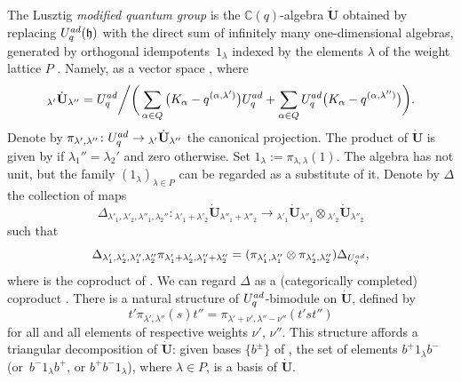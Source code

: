 \documentclass[11pt]{article}
\numberwithin{equation}{section}
\numberwithin{equation}{section}
\theoremstyle{definition}
\newcommand{\mc}{\mathbb{C}}
\newcommand{\ra}{\rightarrow}
\begin{document}
The Lusztig {\it modified quantum group} is the $\mc(q)$-algebra $\dot{\mathbf{U}}$ obtained by replacing $U_q^{\rm ad}(\mathfrak{h})$ with the direct sum of infinitely many one-dimensional algebras, generated by orthogonal idempotents~$1_\lambda$ indexed by the elements $\lambda$ of the weight lattice $P$ \cite[Chapter~23]{Lusztig}. Namely, as a vector space , where
\[{}_{\lambda'}\dot{\mathbf{U}}{}_{\lambda''} = U_q^{\rm ad}\bigg/\bigg(\sum_{\alpha\in Q} \big(K_\alpha -q^{(\alpha,\lambda')}\big)U_q^{\rm ad}+ \sum_{\alpha\in Q} U_q^{\rm ad}\big(K_\alpha -q^{(\alpha,\lambda'')}\big)\bigg).\]
Denote by $\pi_{\lambda',\lambda''}\colon U_q^{\rm ad} \ra {}_{\lambda'}\dot{\mathbf{U}}{}_{\lambda''}$ the canonical projection. The product of $\dot{\mathbf{U}}$ is given by  if $\lambda_1''=\lambda_2'$ and zero otherwise. Set $1_\lambda := \pi_{\lambda,\lambda}(1)$. The algebra  has not unit, but the family $(1_\lambda)_{\lambda\in P}$ can be regarded as a substitute of it. Denote by $\Delta$ the collection of maps
\[
\Delta_{\lambda'_1,\lambda'_2,\lambda''_1,\lambda_2''} \colon {}_{\lambda'_1+\lambda'_2} \dot{\mathbf{U}} {}_{\lambda''_1+\lambda''_2} \ra {}_{\lambda'_1} \dot{\mathbf{U}} {}_{\lambda''_1}\otimes {}_{\lambda'_2} \dot{\mathbf{U}} {}_{\lambda''_2}
\]
 such that
\begin{equation}\label{defcoprod}
\Delta_{\lambda'_1,\lambda'_2,\lambda''_1,\lambda''_2} \pi_{\lambda'_1+\lambda'_2,\lambda''_1+\lambda''_2} = (\pi_{\lambda'_1,\lambda''_1}\otimes \pi_{\lambda'_2,\lambda''_2})\Delta_{U_q^{\rm ad}},
\end{equation}
where  is the coproduct of . We can regard $\Delta$ as a (categorically completed) coproduct \smash{$\Delta \colon \dot{\mathbf{U}} \ra \dot{\mathbf{U}} {}^{\hat{\otimes}2}$}. There is a natural structure of $U_q^{\rm ad}$-bimodule on $\dot{\mathbf{U}}$, defined by
\begin{equation}\label{bimodstr}
t'\pi_{\lambda',\lambda''}(s)t'' = \pi_{\lambda'+\nu',\lambda''-\nu''}(t'st'')
\end{equation}
for all  and all elements  of respective weights $\nu'$, $\nu''$. This structure affords a triangular decomposition of $\dot{\mathbf{U}}$: given bases $\{b^\pm\}$ of , the set of elements $b^+1_\lambda b^-$ (or~$b^-1_\lambda b^+$, or $b^+b^-1_\lambda$), where $\lambda\in P$, is a basis of $\dot{\mathbf{U}}$.
\end{document}
